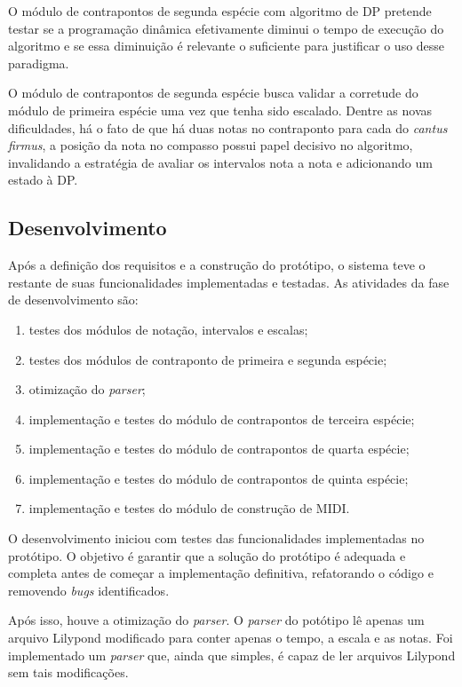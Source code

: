     O módulo de contrapontos de segunda espécie com algoritmo de DP pretende testar se a programação dinâmica efetivamente diminui o tempo de execução do algoritmo e se essa diminuição é relevante o suficiente para justificar o uso desse paradigma.

    O módulo de contrapontos de segunda espécie busca validar a corretude do módulo de primeira espécie uma vez que tenha sido escalado. Dentre as novas dificuldades, há o fato de que há duas notas no contraponto para cada do \textit{cantus firmus}, a posição da nota no compasso possui papel decisivo no algoritmo, invalidando a estratégia de avaliar os intervalos nota a nota e adicionando um estado à DP.

  \subsection[Desenvolvimento]{Desenvolvimento}

    Após a definição dos requisitos e a construção do protótipo, o sistema teve o restante de suas funcionalidades implementadas e testadas. As atividades da fase de desenvolvimento são:

    \begin{enumerate}
      \item testes dos módulos de notação, intervalos e escalas;
      \item testes dos módulos de contraponto de primeira e segunda espécie;
      \item otimização do \textit{parser};
      \item implementação e testes do módulo de contrapontos de terceira espécie;
      \item implementação e testes do módulo de contrapontos de quarta espécie;
      \item implementação e testes do módulo de contrapontos de quinta espécie;
      \item implementação e testes do módulo de construção de MIDI.
    \end{enumerate}

    O desenvolvimento iniciou com testes das funcionalidades implementadas no protótipo. O objetivo é garantir que a solução do protótipo é adequada e completa antes de começar a implementação definitiva, refatorando o código e removendo \textit{bugs} identificados.

    Após isso, houve a otimização do \textit{parser}. O \textit{parser} do potótipo lê apenas um arquivo Lilypond modificado para conter apenas o tempo, a escala e as notas. Foi implementado um \textit{parser} que, ainda que simples, é capaz de ler arquivos Lilypond sem tais modificações.

